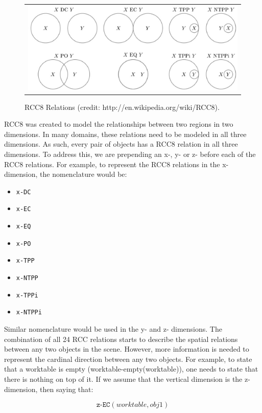 \documentclass[final,1p,times]{elsarticle}
\newcommand{\rcc}[1] {\texttt{#1}}
\begin{document}
\begin{figure}[h!t!]
\begin{center}
\begin{tabular}{c}
\includegraphics[width=12cm]{rcc8.eps}
\end{tabular}
\end{center}
\caption{RCC8 Relations (credit: http://en.wikipedia.org/wiki/RCC8).}
\label{fig:RCC8}
\end{figure}

RCC8 was created to model the relationships between two regions in two dimensions. In many domains, these relations need to be modeled in all three dimensions. As such, every pair of objects has a RCC8 relation in all three dimensions. To address this, we are prepending an x-, y- or z- before each of the RCC8 relations. For example, to represent the RCC8 relations in the x-dimension, the nomenclature would be:
\begin{itemize}
  \item \rcc{x-DC}
  \item \rcc{x-EC}
  \item \rcc{x-EQ}
  \item \rcc{x-PO}
  \item \rcc{x-TPP}
  \item \rcc{x-NTPP}
  \item \rcc{x-TPPi}
  \item \rcc{x-NTPPi}
\end{itemize}

Similar nomenclature would be used in the y- and z- dimensions. The combination of all 24 RCC relations starts to describe the spatial relations between any two objects in the scene. However, more information is needed to represent the cardinal direction between any two objects. For example, to state that a worktable is empty (worktable-empty(worktable)), one needs to state that there is nothing on top of it. If we assume that the vertical dimension is the z-dimension, then saying that:

\begin{equation}\label{eq:z-EC}
\texttt{z-EC}(\textit{worktable}, \textit{obj1})
\end{equation}
\end{document}
